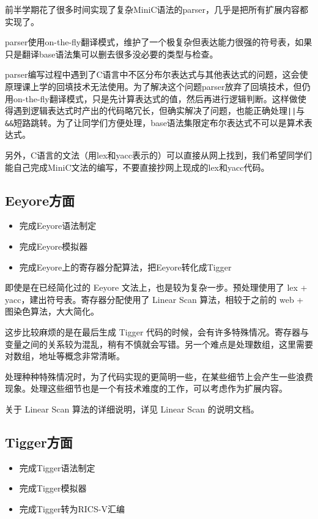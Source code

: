 \documentclass[a4paper]{ctexart}
\begin{document}
前半学期花了很多时间实现了复杂MiniC语法的parser，几乎是把所有扩展内容都实现了。

parser使用on-the-f\/ly翻译模式，维护了一个极复杂但表达能力很强的符号表，如果只是翻译base语法集可以删去很多没必要的类型与检查。

parser编写过程中遇到了C语言中不区分布尔表达式与其他表达式的问题，这会使原理课上学的回填技术无法使用。为了解决这个问题parser放弃了回填技术，但仍用on-the-f\/ly翻译模式，只是先计算表达式的值，然后再进行逻辑判断。这样做使得遇到逻辑表达式时产出的代码略冗长，但确实解决了问题，也能正确处理\texttt{||}与\texttt{\&\&}短路跳转。为了让同学们方便处理，base语法集限定布尔表达式不可以是算术表达式。

另外，C语言的文法（用lex和yacc表示的）可以直接从网上找到，我们希望同学们能自己完成MiniC文法的编写，不要直接抄网上现成的lex和yacc代码。

\subsection{Eeyore方面}

\begin{itemize}
	\item 完成Eeyore语法制定
	\item 完成Eeyore模拟器
	\item 完成Eeyore上的寄存器分配算法，把Eeyore转化成Tigger
\end{itemize}

即使是在已经简化过的 Eeyore 文法上，也是较为复杂一步。预处理使用了 lex + yacc，建出符号表。寄存器分配使用了 Linear Scan 算法，相较于之前的 web + 图染色算法，大大简化。

这步比较麻烦的是在最后生成 Tigger 代码的时候，会有许多特殊情况。寄存器与变量之间的关系较为混乱，稍有不慎就会写错。另一个难点是处理数组，这里需要对数组，地址等概念非常清晰。

处理种种特殊情况时，为了代码实现的更简明一些，在某些细节上会产生一些浪费现象。处理这些细节也是一个有技术难度的工作，可以考虑作为扩展内容。

关于 Linear Scan 算法的详细说明，详见 Linear Scan 的说明文档。

\subsection{Tigger方面}

\begin{itemize}
	\item  完成Tigger语法制定
	\item  完成Tigger模拟器
	\item  完成Tigger转为RICS-V汇编
\end{itemize}
\end{document}
